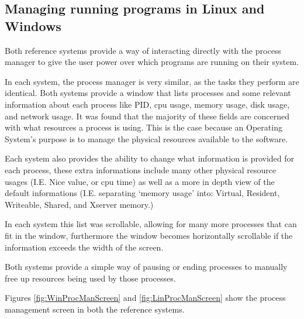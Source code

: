 \documentclass[a4paper]{report}
\begin{document}
\subsection{Managing running programs in Linux and Windows}

Both reference systems provide a way of interacting directly with the process manager to give the user power over which programs are running on their system.

In each system, the process manager is very similar, as the tasks they perform are identical. Both systems provide a window that lists processes and some relevant information about each process like PID, cpu usage, memory usage, disk usage, and network usage. It was found that the majority of these fields are concerned with what resources a process is using. This is the case because an Operating System's purpose is to manage the physical resources available to the software.

Each system also provides the ability to change what information is provided for each process, these extra informations include many other physical resource usages (I.E. Nice value, or cpu time) as well as a more in depth view of the default informations (I.E. separating `memory usage' into: Virtual, Resident, Writeable, Shared, and Xserver memory.)

In each system this list was scrollable, allowing for many more processes that can fit in the window, furthermore the window becomes horizontally scrollable if the information exceeds the width of the screen.

Both systems provide a simple way of pausing or ending processes to manually free up resources being used by those processes.

Figures \ref{fig:WinProcManScreen} and \ref{fig:LinProcManScreen} show the process management screen in both the reference systems.
\end{document}

